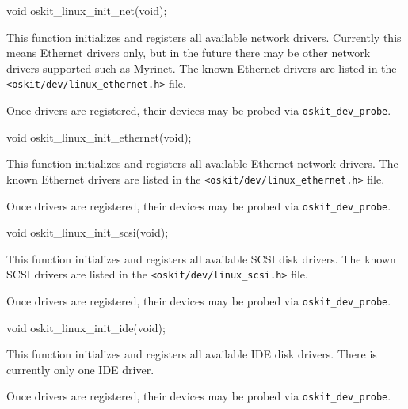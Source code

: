 \begin{apisyn}

	\funcproto void oskit_linux_init_net(void);
\end{apisyn}
\begin{apidesc}
	This function initializes and registers all available network drivers.
	Currently this means Ethernet drivers only,
	but in the future there may be other network drivers supported such
	as Myrinet.
	The known Ethernet drivers are listed in the
	\texttt{<oskit/dev/linux_ethernet.h>} file.

	Once drivers are registered, their devices may be probed
	via \texttt{oskit_dev_probe}.
\end{apidesc}


\begin{apisyn}

	\funcproto void oskit_linux_init_ethernet(void);
\end{apisyn}
\begin{apidesc}
	This function initializes and registers all available Ethernet
	network drivers.
	The known Ethernet drivers are listed in the
	\texttt{<oskit/dev/linux_ethernet.h>} file.

	Once drivers are registered, their devices may be probed
	via \texttt{oskit_dev_probe}.
\end{apidesc}


\begin{apisyn}

	\funcproto void oskit_linux_init_scsi(void);
\end{apisyn}
\begin{apidesc}
	This function initializes and registers all available SCSI disk drivers.
	The known SCSI drivers are listed in the
	\texttt{<oskit/dev/linux_scsi.h>} file.

	Once drivers are registered, their devices may be probed
	via \texttt{oskit_dev_probe}.
\end{apidesc}


\begin{apisyn}

	\funcproto void oskit_linux_init_ide(void);
\end{apisyn}
\begin{apidesc}
	This function initializes and registers all available IDE disk drivers.
	There is currently only one IDE driver.

	Once drivers are registered, their devices may be probed
	via \texttt{oskit_dev_probe}.
\end{apidesc}


